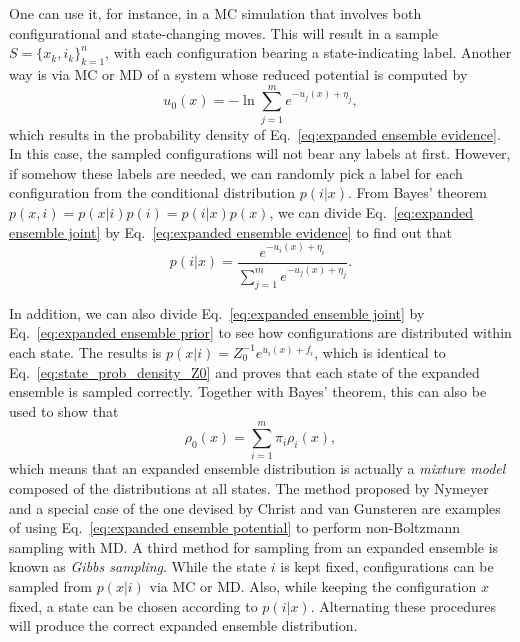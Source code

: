 \documentclass[aip,jcp,reprint,amsmath,amssymb]{revtex4-1}
\begin{document}
One can use it, for instance, in a MC simulation that involves both configurational and state-changing moves.\cite{Lyubartsev_1992} This will result in a sample $S = \{x_k,i_k\}_{k=1}^n$, with each configuration bearing a state-indicating label. Another way is via MC or MD of a system whose reduced potential is computed by
\begin{equation}
u_0(x) = - \ln \sum_{j=1}^m e^{-u_j(x) + \eta_j},
\end{equation}
which results in the probability density of Eq.~\eqref{eq:expanded ensemble evidence}. In this case, the sampled configurations will not bear any labels at first. However, if somehow these labels are needed, we can randomly pick a label for each configuration from the conditional distribution $p(i|x)$.\cite{Nymeyer_2010} From Bayes' theorem $p(x,i) = p(x|i) p(i) = p(i|x) p(x)$, we can divide Eq.~\eqref{eq:expanded ensemble joint} by Eq.~\eqref{eq:expanded ensemble evidence} to find out that
\begin{equation}
p(i|x) = \frac{e^{-u_i(x) + \eta_i}}{\sum_{j=1}^m e^{-u_j(x) + \eta_j}}.
\end{equation}

In addition, we can also divide Eq.~\eqref{eq:expanded ensemble joint} by Eq.~\eqref{eq:expanded ensemble prior} to see how configurations are distributed within each state. The results is $p(x|i) = Z_0^{-1} e^{u_i(x) + f_i}$, which is identical to Eq.~\eqref{eq:state_prob_density_Z0} and proves that each state of the expanded ensemble is sampled correctly. Together with Bayes' theorem, this can also be used to show that
\begin{equation}
\rho_0(x) = \sum_{i=1}^m \pi_i \rho_i(x),
\end{equation}
which means that an expanded ensemble distribution is actually a \textit{mixture model}\cite{Lindsay_1995, Marin_2005} composed of the distributions at all states. The method proposed by Nymeyer\cite{Nymeyer_2010} and a special case of the one devised by Christ and van Gunsteren\cite{Christ_2007, *Christ_2008, *Christ_2009} are examples of using Eq.~\eqref{eq:expanded ensemble potential} to perform non-Boltzmann sampling with MD. A third method for sampling from an expanded ensemble is known as \textit{Gibbs sampling}.\cite{Marin_2005, Chodera_2011} While the state $i$ is kept fixed, configurations can be sampled from $p(x|i)$ via MC or MD. Also, while keeping the configuration $x$ fixed, a state can be chosen according to $p(i|x)$. Alternating these procedures will produce the correct expanded ensemble distribution.\cite{Chodera_2011}
\end{document}
